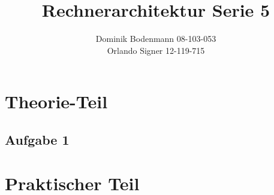 \documentclass[a4paper,abstracton]{scrartcl}
\title{Rechnerarchitektur Serie 5}
\author{Dominik Bodenmann 08-103-053\\
	Orlando Signer 12-119-715\\}
\begin{document}
\maketitle

\section{Theorie-Teil}

\subsection{Aufgabe 1}

\newpage
\section{Praktischer Teil}

\newpage

\end{document}
